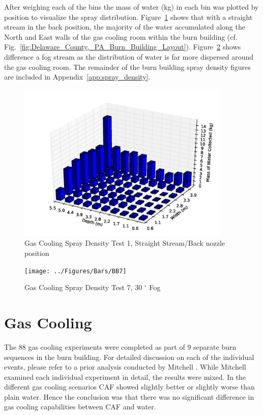 \documentclass[12pt,oneside]{book}
\begin{document}
After weighing each of the bins the mass of water (kg) in each bin was plotted by position to visualize the spray distribution. Figure~\ref{fig:Burn_Building_Test_1} shows that with a straight stream in the back position, the majority of the water accumulated along the North and East walls of the gas cooling room within the burn building (cf. Fig.~\ref{fig:Delaware_County,_PA_Burn_Building_Layout}). Figure~\ref{fig:Burn_Building_Test_7} shows difference a fog stream as the distribution of water is far more dispersed around the gas cooling room. The remainder of the burn building spray density figures are included in Appendix~\ref{app:spray_density}.

\begin{figure}[!ht]
	\includegraphics[width=4in]{../Figures/Bars/BB1}
	\caption{Gas Cooling Spray Density Test 1, Straight Stream/Back nozzle position}
	\label{fig:Burn_Building_Test_1}
\end{figure}

\begin{figure}[!ht]
	\texttt{[image: ../Figures/Bars/BB7]}
	\caption{Gas Cooling Spray Density Test 7, 30 $^{\circ}$ Fog} 
	\label{fig:Burn_Building_Test_7}
\end{figure}


\clearpage

\section{Gas Cooling}
\label{sec:Gas_Cooling}

The 88 gas cooling experiments were completed as part of 9 separate burn sequences in the burn building. For detailed discussion on each of the individual events, please refer to a prior analysis conducted by Mitchell \cite{Mitchell:1}. While Mitchell examined each individual experiment in detail, the results were mixed.  In the different gas cooling scenarios CAF showed slightly better or slightly worse than plain water.  Hence the conclusion was that there was no significant difference in gas cooling capabilities between CAF and water.  
\end{document}
